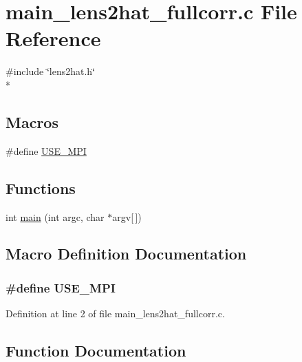 \section{main\-\_\-lens2hat\-\_\-fullcorr.\-c File Reference}
\label{main__lens2hat__fullcorr_8c}
{\ttfamily \#include \char`\"{}lens2hat.\-h\char`\"{}}\\*
\subsection*{Macros}
\begin{DoxyCompactItemize}
\item 
\#define \hyperlink{main__lens2hat__fullcorr_8c_a3869d282031f6ea6b50fdb980b758420}{U\-S\-E\-\_\-\-M\-P\-I}
\end{DoxyCompactItemize}
\subsection*{Functions}
\begin{DoxyCompactItemize}
\item 
int \hyperlink{main__lens2hat__fullcorr_8c_a0ddf1224851353fc92bfbff6f499fa97}{main} (int argc, char $\ast$argv\mbox{[}$\,$\mbox{]})
\end{DoxyCompactItemize}


\subsection{Macro Definition Documentation}
\subsubsection[{U\-S\-E\-\_\-\-M\-P\-I}]{\setlength{\rightskip}{0pt plus 5cm}\#define U\-S\-E\-\_\-\-M\-P\-I}\label{main__lens2hat__fullcorr_8c_a3869d282031f6ea6b50fdb980b758420}


Definition at line 2 of file main\-\_\-lens2hat\-\_\-fullcorr.\-c.



\subsection{Function Documentation}
